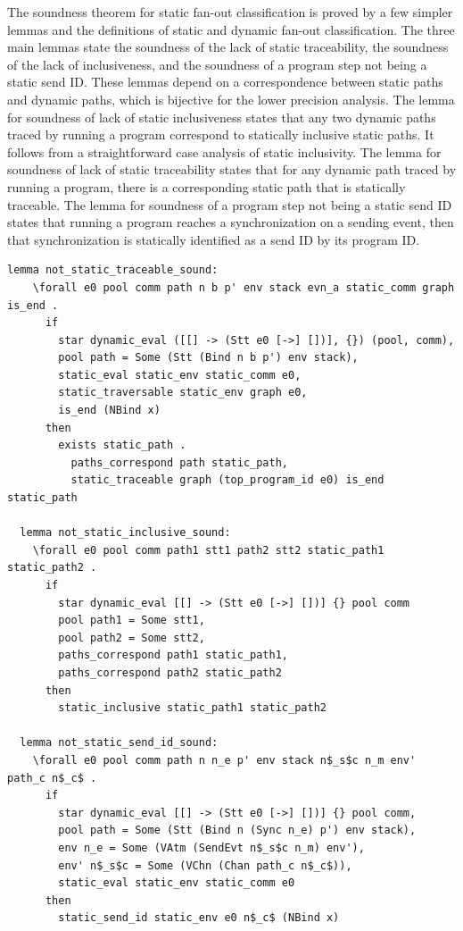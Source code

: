 \documentclass[10pt]{article}
\begin{document}
The soundness theorem for static fan-out classification is proved
by a few simpler lemmas and the
definitions of static and dynamic fan-out classification.  The three main lemmas state the
soundness of the lack of static traceability, the soundness of the lack of inclusiveness, and
the soundness of a program step not being a static send ID. These lemmas depend on a
correspondence between static paths and dynamic paths, which is bijective for the lower
precision analysis. The lemma for soundness of lack of static inclusiveness states that any two
dynamic paths traced by running a program correspond to statically inclusive static paths. It
follows from a straightforward case analysis of static inclusivity. The lemma for soundness of
lack of static traceability states that for any dynamic path traced by running a program, there
is a corresponding static path that is statically traceable. The lemma for soundness of a
program step not being a static send ID states that running a program reaches a
synchronization on a sending event, then that synchronization is statically identified as a
send ID by its program ID.

\begin{lstlisting}[language=logic, mathescape]
  lemma not_static_traceable_sound:
    \forall e0 pool comm path n b p' env stack evn_a static_comm graph is_end .
      if
        star dynamic_eval ([[] -> (Stt e0 [->] [])], {}) (pool, comm), 
        pool path = Some (Stt (Bind n b p') env stack),
        static_eval static_env static_comm e0,
        static_traversable static_env graph e0,
        is_end (NBind x)
      then
        exists static_path . 
          paths_correspond path static_path, 
          static_traceable graph (top_program_id e0) is_end static_path

  lemma not_static_inclusive_sound:
    \forall e0 pool comm path1 stt1 path2 stt2 static_path1 static_path2 . 
      if
        star dynamic_eval [[] -> (Stt e0 [->] [])] {} pool comm
        pool path1 = Some stt1, 
        pool path2 = Some stt2, 
        paths_correspond path1 static_path1, 
        paths_correspond path2 static_path2
      then
        static_inclusive static_path1 static_path2

  lemma not_static_send_id_sound:
    \forall e0 pool comm path n n_e p' env stack n$_s$c n_m env' path_c n$_c$ .
      if
        star dynamic_eval [[] -> (Stt e0 [->] [])] {} pool comm, 
        pool path = Some (Stt (Bind n (Sync n_e) p') env stack), 
        env n_e = Some (VAtm (SendEvt n$_s$c n_m) env'), 
        env' n$_s$c = Some (VChn (Chan path_c n$_c$)), 
        static_eval static_env static_comm e0
      then 
        static_send_id static_env e0 n$_c$ (NBind x)
\end{lstlisting}
\end{document}

